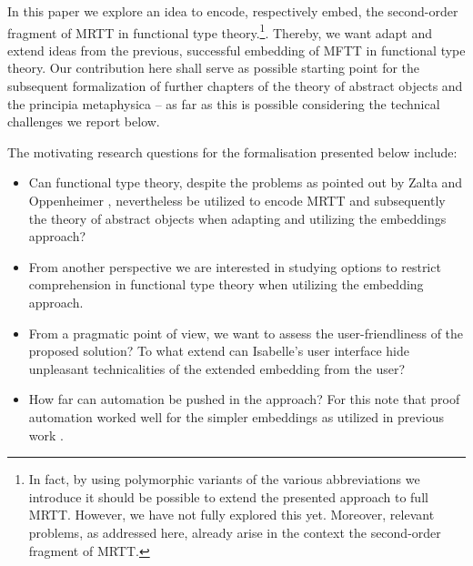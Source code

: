 \begin{isabellebody}
\begin{isamarkuptext}
  In this paper we explore an idea to encode, respectively embed, the second-order fragment of  MRTT in 
  functional type theory.\footnote{In fact, by using polymorphic variants of the various abbreviations
  we introduce it should be possible to extend the presented approach to full MRTT. However, we
  have not fully explored this yet. Moreover, relevant problems, as addressed here, already arise in the context 
  the second-order fragment of MRTT.}. 
  Thereby, we want adapt and extend ideas from the previous, successful embedding of MFTT in functional 
  type theory.
  Our contribution here shall serve as possible starting point for the subsequent
  formalization of further chapters of the theory of abstract objects and the principia 
  metaphysica -- as far as this is possible considering the technical challenges we report below. 

 
  The motivating research questions for the formalisation presented below include:
  \begin{itemize} 
  \item Can functional type theory, despite the problems as pointed 
   out by Zalta and
   Oppenheimer \cite{zalta11:_relat_versus_funct_found_logic}, 
   nevertheless be utilized to encode MRTT and subsequently the theory of abstract 
   objects when adapting and utilizing the embeddings approach? 
  \item From another perspective we are interested in studying options to restrict comprehension in 
   functional type theory when utilizing the embedding approach.
  \item From a pragmatic point of view, we want to assess the user-friendliness of 
   the proposed solution? 
   To what extend can Isabelle's  user interface hide 
   unpleasant technicalities of the extended embedding from the user?
  \item How far can automation be pushed in the approach? For this note that proof automation 
    worked  well for the simpler embeddings as utilized in previous work \cite{C40,C55}. 
  \end{itemize}


\end{isamarkuptext}
\end{isabellebody}
